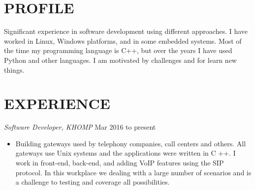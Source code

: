 \documentclass[line,margin]{res}
\begin{document}
\address{alvarofleith@gmail.com or +64 (09) 889-3534}
\address{https://linkedin.com/in/alvarofleith}

 
\begin{resume}
 
\section{PROFILE}       Significant experience in software development using different approaches. I have worked in Linux, Windows platforms, and in some embedded systems. Most of the time my programming language is C++, but over the years I have used Python and other languages. I am motivated by challenges and for learn new things.
 
 
 \section{EXPERIENCE} {\sl Software Developer, KHOMP} \hfill Mar 2016 to present \\
                 \begin{itemize}  \itemsep -2pt
                 \item Building gateways used by telephony companies, call centers and others. All gateways use Unix systems and the applications were written in C ++. I work in front-end, back-end, and adding VoIP features using the SIP protocol. In this workplace we dealing with a large number of scenarios and is a challenge to testing and coverage all possibilities.
                \end{itemize}
 

\end{resume}
\end{document}
